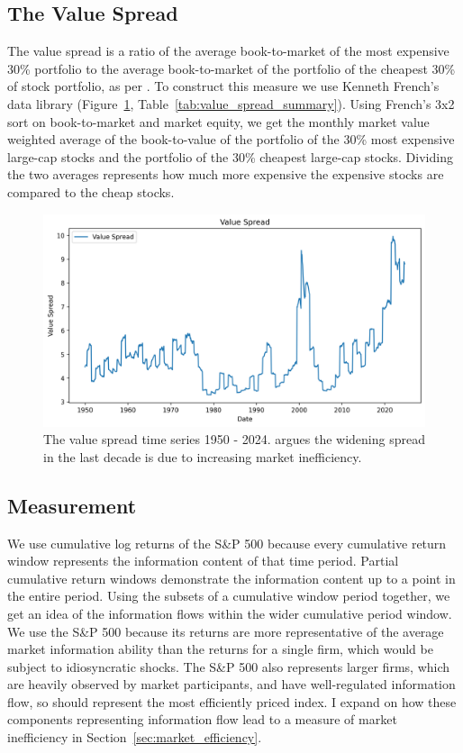 
\subsection{The Value Spread}
The value spread is a ratio of the average book-to-market of the most expensive 30\% portfolio to the average book-to-market of the portfolio of the cheapest 30\% of stock portfolio, as per \citet{fama_french_1993}.
To construct this measure we use Kenneth French's data library \citep{french_website} (Figure~\ref{fig:value_spread}, Table~\ref{tab:value_spread_summary}). 
Using French's 3x2 sort on book-to-market and market equity, we get the monthly market value weighted average of the book-to-value of the portfolio of the 30\% most expensive large-cap stocks and the portfolio of the 30\% cheapest large-cap stocks.
Dividing the two averages represents how much more expensive the expensive stocks are compared to the cheap stocks.

\begin{figure}[h!]
    \centering
    \includegraphics[width=1\textwidth]{../figs/Value_Spread.png}
    \caption{The value spread time series 1950 - 2024. \citet{asness_2024} argues the widening spread in the last decade is due to increasing market inefficiency.}
    \label{fig:value_spread}
\end{figure}

\subsection{Measurement}
We use cumulative log returns of the S\&P 500 because every cumulative return window represents the information content of that time period. Partial cumulative return
windows demonstrate the information content up to a point in the entire period. Using the subsets of a cumulative window period together, we get an idea of the
information flows within the wider cumulative period window. We use the S\&P 500 because its returns are more representative of the average market information ability
than the returns for a single firm, which would be subject to idiosyncratic shocks. The S\&P 500 also represents larger firms, which are heavily observed by market participants, and have well-regulated information flow, 
so should represent the most efficiently priced index. I expand on how these components representing information flow lead to a measure of market inefficiency in Section~\ref{sec:market_efficiency}.